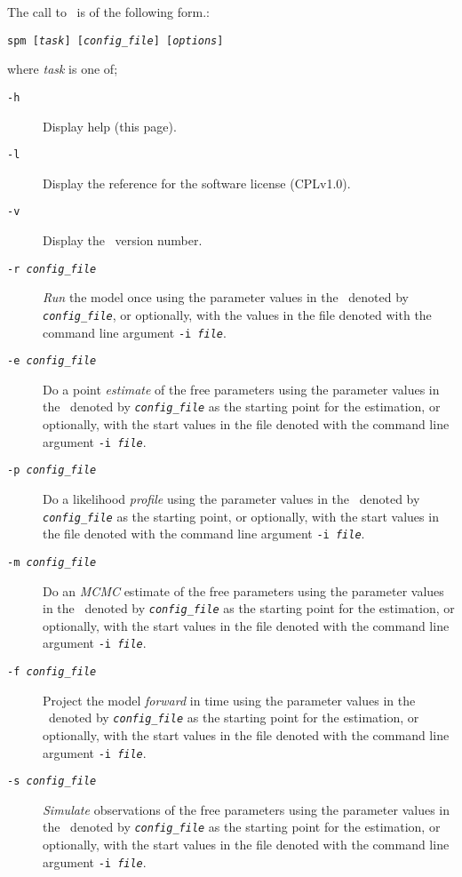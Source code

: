 The call to \SPM\ is of the following form.: 

\texttt{spm [\emph{task}] [\emph{config\_file}] [\emph{options}]}

where \emph{task} is one of;
\begin{description}
\item [\texttt{-h}]  Display help (this page).
\item [\texttt{-l}] Display the reference for the software license (CPLv1.0).
\item [\texttt{-v}] Display the \SPM\ version number.

\item [\texttt{-r \emph{config\_file}}] \emph{Run} the model once using the parameter values in the \config\ denoted by \emph{\texttt{config\_file}}, or optionally, with the values in the file denoted with the command line argument \texttt{-i \emph{file}}.

\item [\texttt{-e \emph{config\_file}}] Do a point \emph{estimate} of the free parameters using the parameter values in the \config\ denoted by \emph{\texttt{config\_file}} as the starting point for the estimation, or optionally, with the start values in the file denoted with the command line argument \texttt{-i \emph{file}}.

\item [\texttt{-p \emph{config\_file}}] Do a likelihood \emph{profile} using the parameter values in the \config\ denoted by \emph{\texttt{config\_file}} as the starting point, or optionally, with the start values in the file denoted with the command line argument \texttt{-i \emph{file}}.

\item [\texttt{-m \emph{config\_file}}] Do an \emph{MCMC} estimate of the free parameters using the parameter values in the \config\ denoted by \emph{\texttt{config\_file}} as the starting point for the estimation, or optionally, with the start values in the file denoted with the command line argument \texttt{-i \emph{file}}.

\item [\texttt{-f \emph{config\_file}}] Project the model \emph{forward} in time using the parameter values in the \config\ denoted by \emph{\texttt{config\_file}} as the starting point for the estimation, or optionally, with the start values in the file denoted with the command line argument \texttt{-i \emph{file}}.

\item [\texttt{-s \emph{config\_file}}] \emph{Simulate} observations of the free parameters using the parameter values in the \config\ denoted by \emph{\texttt{config\_file}} as the starting point for the estimation, or optionally, with the start values in the file denoted with the command line argument \texttt{-i \emph{file}}.

\end{description}

